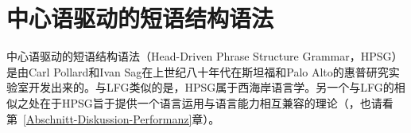 
\chapter{中心语驱动的短语结构语法}
\label{Kapitel-HPSG}
\label{chap-HPSG}

中心语驱动的短语结构语法（Head-Driven Phrase Structure Grammar，HPSG） 是由Carl Pollard和Ivan Sag在上世纪八十年代在斯坦福和Palo Alto的惠普研究实验室开发出来的\citep{ps,ps2}。与LFG类似的是，HPSG属于西海岸语言学。另一个与LFG的相似之处在于HPSG旨于提供一个语言运用与语言能力相互兼容的理论（\citealp{SW2011a,SW2015a}，也请看第~\ref{Abschnitt-Diskussion-Performanz}章）。

